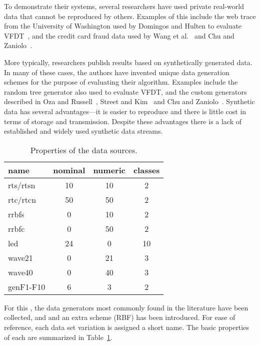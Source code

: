 To demonstrate their systems, several researchers have used private real-world data that cannot be reproduced by others. Examples of this include the web trace from the University of Washington used by Domingos and Hulten to evaluate VFDT~\cite{vfdt}, and the credit card fraud data used by Wang et al.~\cite{cdensemble} and Chu and Zaniolo~\cite{fastlightboost}.

More typically, researchers publish results based on synthetically generated data.
In many of these cases, the authors have invented unique data generation schemes for the purpose of evaluating their algorithm.
Examples include the random tree generator also used to evaluate VFDT, and the custom generators described in Oza and Russell~\cite{ozaexp}, Street and Kim~\cite{sea} and Chu and Zaniolo~\cite{fastlightboost}.
Synthetic data has several advantages---it is easier to reproduce and there is little cost in terms of storage and transmission.
Despite these advantages there is a lack of established and widely used synthetic data streams. 

\begin{table}
\caption{Properties of the data sources.}
\centering
\begin{tabular}{|l|c|c|c|}
\hline
name     &    nominal    &    numeric    &    classes    \\
\hline
{\sc rts/rtsn}    &    10    &    10    &    2    \\
{\sc rtc/rtcn}    &    50    &    50    &    2    \\
{\sc rrbfs}    &    0    &    10    &    2    \\
{\sc rrbfc}    &    0    &    50    &    2    \\
{\sc led}    &    24    &    0    &    10    \\
{\sc wave21}    &    0    &    21    &    3    \\
{\sc wave40}    &    0    &    40    &    3    \\
{\sc genF1-F10}    &    6    &    3    &    2    \\
\hline
\end{tabular}
\label{tab:datasets}
\end{table}

For this \thesisc, the data generators most commonly found in the literature have been collected, and and an extra scheme (RBF) has been introduced. For ease of reference, each data set variation is assigned a short name. The basic properties of each are summarized in Table~\ref{tab:datasets}.

